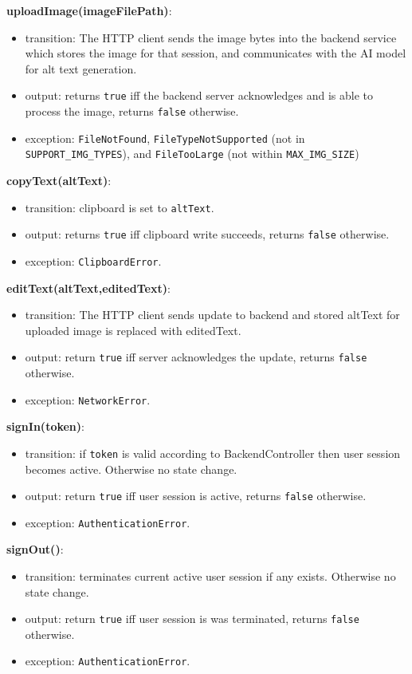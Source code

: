 \documentclass[12pt, titlepage]{article}
\begin{document}
\noindent \textbf{uploadImage(imageFilePath)}:
\begin{itemize}
\item transition: The HTTP client sends the image bytes into the backend service which stores the image for that session, and communicates 
with the AI model for alt text generation. 
\item output: returns \texttt{true} iff the backend server acknowledges and is able to process the image, returns \texttt{false} otherwise.
\item exception: \texttt{FileNotFound}, \texttt{FileTypeNotSupported} (not in \texttt{SUPPORT\_IMG\_TYPES}), 
and \texttt{FileTooLarge} (not within \texttt{MAX\_IMG\_SIZE})
\end{itemize}

\noindent \textbf{copyText(altText)}:
\begin{itemize} 
\item transition: clipboard is set to \texttt{altText}.
\item output: returns \texttt{true} iff clipboard write succeeds, returns \texttt{false} otherwise. 
\item exception: \texttt{ClipboardError}.
\end{itemize}

\noindent \textbf{editText(altText,editedText)}:
\begin{itemize}
\item transition: The HTTP client sends update to backend and stored altText for uploaded image is replaced with editedText.
\item output: return \texttt{true} iff server acknowledges the update, returns \texttt{false} otherwise.
\item exception: \texttt{NetworkError}.
\end{itemize}

\noindent \textbf{signIn(token)}:
\begin{itemize}
  \item transition: if \texttt{token} is valid according to
    BackendController then user session becomes active.
    Otherwise no state change.
  \item output: return \texttt{true} iff user session is active,
    returns \texttt{false} otherwise.
  \item exception: \texttt{AuthenticationError}.
\end{itemize}

\noindent \textbf{signOut()}:
\begin{itemize}
  \item transition: terminates current active user session if any exists.
    Otherwise no state change.
  \item output: return \texttt{true} iff user session is was
    terminated, returns \texttt{false} otherwise.
  \item exception: \texttt{AuthenticationError}.
\end{itemize}
\end{document}
